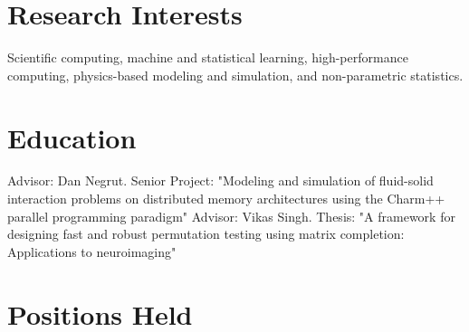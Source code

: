 \documentclass[11pt,a4paper,sans]{moderncv}        %
\begin{document}
\makecvtitle

\section{Research Interests}
Scientific computing, machine and statistical learning, high-performance computing, physics-based modeling and simulation, and non-parametric statistics.

\section{Education}
{Advisor: Dan Negrut. Senior Project: "Modeling and simulation of fluid-solid interaction problems on distributed memory architectures using the Charm++ parallel programming paradigm"}  %
{Advisor: Vikas Singh. Thesis: "A framework for designing fast and robust permutation testing using matrix completion: Applications to neuroimaging"}


\section{Positions Held}
\end{document}
